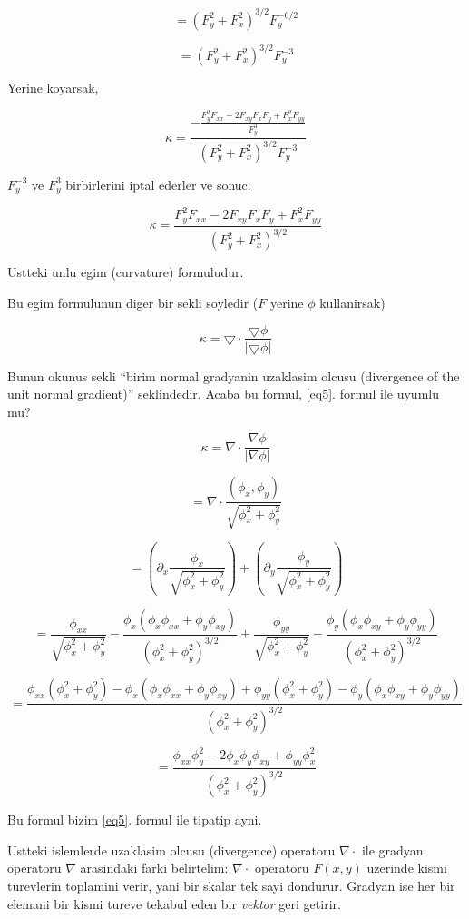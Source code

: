 \documentclass[12pt,fleqn]{article}\usepackage{../common}
\begin{document}
\[ = (F_y^2 + F_x^2)^{3/2}F_y^{-6/2}  \]

\[ = (F_y^2 + F_x^2)^{3/2}F_y^{-3} \]

Yerine koyarsak,

\[ 
\kappa = \frac{\displaystyle
- \frac{F_y^2F_{xx} - 2F_{xy}F_xF_y + F_x^2F_{yy}}{F_y^3}}
{(F_y^2 + F_x^2)^{3/2}F_y^{-3}}
 \]

$F_y^{-3}$ ve $F_y^{3}$ birbirlerini iptal ederler ve sonuc:

\begin{equation}\kappa = \frac{F_y^2F_{xx} - 2F_{xy}F_xF_y + F_x^2F_{yy}}{(F_y^2 + F_x^2)^{3/2}} \label{eq5}\end{equation}

Ustteki unlu egim (curvature) formuludur. 

Bu egim formulunun diger bir sekli soyledir ($F$ yerine $\phi$ kullanirsak)

\[ \kappa = \bigtriangledown \cdot \frac{\bigtriangledown \phi}{|\bigtriangledown \phi|} \]

Bunun okunus sekli ``birim normal gradyanin uzaklasim olcusu (divergence of the
unit normal gradient)'' seklindedir. Acaba bu formul, \ref{eq5}. formul ile
uyumlu mu?

\[ \kappa = \nabla \cdot \frac{\nabla \phi}{|\nabla \phi|}  \]

\[ = \nabla \cdot \frac{(\phi_x,\phi_y)}{\sqrt{\phi_x^2+\phi_y^2}} \]

\[ = \left(\partial_x \frac{\phi_x}{\sqrt{\phi_x^2+\phi_y^2}}\right)+ 
\left(\partial_y \frac{\phi_y}{\sqrt{\phi_x^2+\phi_y^2}}\right)  \]

\[ = \frac{\phi_{xx}}{\sqrt{\phi_x^2+\phi_y^2}} - \frac{\phi_x (\phi_x\phi_{xx}+\phi_y\phi_{xy})}
{(\phi_x^2+\phi_y^2)^{3/2}} +
\frac{\phi_{yy}}{\sqrt{\phi_x^2+\phi_y^2}} - \frac{\phi_y(\phi_x\phi_{xy}+\phi_y\phi_{yy})}
{(\phi_x^2+\phi_y^2)^{3/2}}  \]

\[ = \frac{\phi_{xx}(\phi_x^2+\phi_y^2) - \phi_x
  (\phi_x\phi_{xx}+\phi_y\phi_{xy}) +\phi_{yy}(\phi_x^2+\phi_y^2) -
  \phi_y(\phi_x\phi_{xy}+\phi_y\phi_{yy})}{(\phi_x^2+\phi_y^2)^{3/2}} \]

\[ = \frac{\phi_{xx}\phi_y^2 - 2\phi_x\phi_y\phi_{xy} + \phi_{yy}\phi_x^2}{(\phi_x^2+\phi_y^2)^{3/2}}  \]

Bu formul bizim \ref{eq5}. formul ile tipatip ayni.

Ustteki islemlerde uzaklasim olcusu (divergence) operatoru $\nabla \cdot$ ile
gradyan operatoru $\nabla$ arasindaki farki belirtelim:  $\nabla \cdot$
operatoru $F(x,y)$ uzerinde kismi turevlerin toplamini verir, yani bir skalar
tek sayi dondurur. Gradyan ise her bir elemani bir kismi tureve tekabul eden bir
{\em vektor} geri getirir. 
\end{document}
